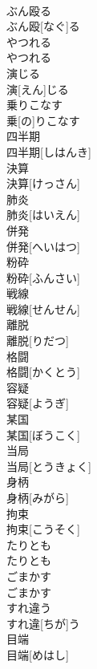 \documentclass[8pt]{extreport}
\begin{document}
\begin{CJK}{UTF8}{min}
\\	ぶん殴る	
\\	ぶん殴[なぐ]る	
\\	やつれる	
\\	やつれる	
\\	演じる	
\\	演[えん]じる	
\\	乗りこなす	
\\	乗[の]りこなす	
\\	四半期	
\\	四半期[しはんき]	
\\	決算	
\\	決算[けっさん]	
\\	肺炎	
\\	肺炎[はいえん]	
\\	併発	
\\	併発[へいはつ]	
\\	粉砕	
\\	粉砕[ふんさい]	
\\	戦線	
\\	戦線[せんせん]	
\\	離脱	
\\	離脱[りだつ]	
\\	格闘	
\\	格闘[かくとう]	
\\	容疑	
\\	容疑[ようぎ]	
\\	某国	
\\	某国[ぼうこく]	
\\	当局	
\\	当局[とうきょく]	
\\	身柄	
\\	身柄[みがら]	
\\	拘束	
\\	拘束[こうそく]	
\\	たりとも	
\\	たりとも	
\\	ごまかす	
\\	ごまかす	
\\	すれ違う	
\\	すれ違[ちが]う	
\\	目端	
\\	目端[めはし]	
\end{CJK}
\end{document}
